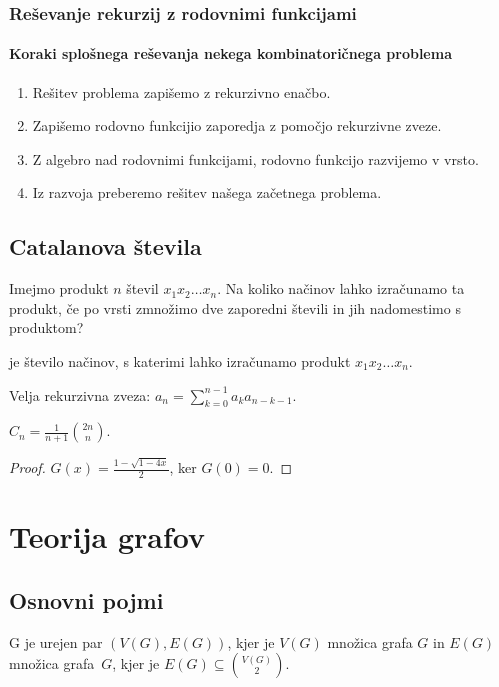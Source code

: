 \subsubsection*{Reševanje rekurzij z rodovnimi funkcijami}
\paragraph{Koraki splošnega reševanja nekega kombinatoričnega problema}
\begin{enumerate}
    \item Rešitev problema zapišemo z rekurzivno enačbo.
    \item Zapišemo rodovno funkcijio zaporedja z pomočjo rekurzivne zveze.
    \item Z algebro nad rodovnimi funkcijami, rodovno funkcijo razvijemo v vrsto.
    \item Iz razvoja preberemo rešitev našega začetnega problema.
\end{enumerate}

\subsection{Catalanova števila}
Imejmo produkt $n$ števil $x_1x_2 \ldots x_n$. Na koliko načinov lahko izračunamo ta produkt, če po vrsti zmnožimo dve zaporedni števili in jih nadomestimo s produktom?

\begin{definicija}
     je število načinov, s katerimi lahko izračunamo produkt $x_1x_2 \ldots x_n$.
\end{definicija}

\begin{opomba}
    Velja rekurzivna zveza: $a_n = \sum_{k=0}^{n-1}a_ka_{n-k-1}$.
\end{opomba}

\begin{trditev}
    $C_n = \frac{1}{n+1} \binom{2n}{n}$.
\end{trditev}

\begin{proof}
    $G(x) = \frac{1-\sqrt{1-4x}}{2}$, ker $G(0)= 0$.
\end{proof}

\section{Teorija grafov}
\subsection{Osnovni pojmi}
\begin{definicija}
     G je urejen par $(V(G), E(G))$, kjer je $V(G)$ množica  grafa $G$ in $E(G)$ množica  grafa~$G$, kjer je $E(G) \subseteq \binom{V(G)}{2}$.
\end{definicija}

